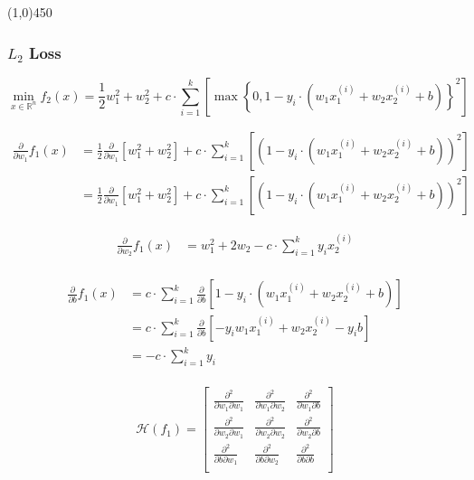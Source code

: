 \documentclass[12pt,landscape]{article}
\newcommand{\hr}{\begin{center} \line(1,0){450} \end{center}}
\begin{document}
\hr
\subsubsection*{$L_2$ Loss}
\newcommand{\lTwoLoss}{1-y_i \cdot \left( w_1  x_1^{(i)} + w_2  x_2^{(i)} + b\right)}
\begin{equation}
\min\limits_{x \in \mathbb{R}^n} f_2(x) = \frac{1}{2} w_1^2 + w_2^2 +c \cdot \sum\limits_{i=1}^k \left[ \max \left\{ 0,\lTwoLoss  \right\}^2\right]
\end{equation}


\begin{align}
\frac{\partial}{\partial w_1} f_1(x) &= \frac{1}{2} \frac{\partial}{\partial w_1} \left[  w_1^2 + w_2^2 \right]  +c \cdot \sum\limits_{i=1}^k  \left[ \left( \lTwoLoss \right)^2 \right]\\
&= \frac{1}{2} \frac{\partial}{\partial w_1} \left[  w_1^2 + w_2^2 \right]  +c \cdot \sum\limits_{i=1}^k  \left[ \left( \lTwoLoss \right)^2 \right]
\end{align}

\begin{align}
\frac{\partial}{\partial w_2} f_1(x) &= w_1^2 + 2w_2  - c \cdot \sum\limits_{i=1}^k y_i  x_2^{(i)} \\
\end{align}



\begin{align}
\frac{\partial}{\partial b} f_1(x) &= c \cdot \sum\limits_{i=1}^k  \frac{\partial}{\partial b} \left[ 1-y_i \cdot \left( w_1  x_1^{(i)} + w_2  x_2^{(i)} + b \right) \right]\\
&= c \cdot \sum\limits_{i=1}^k  \frac{\partial}{\partial b} \left[ -y_i w_1  x_1^{(i)} +  w_2  x_2^{(i)} -y_ib \right]\\
&= - c \cdot \sum\limits_{i=1}^k y_i\\
\end{align}


\begin{equation}
\mathcal{H}(f_1) = \begin{bmatrix}
\frac{\partial^2}{\partial w_1 \partial w_1} & \frac{\partial^2}{\partial w_1 \partial w_2} & \frac{\partial^2}{\partial w_1 \partial b}\\
\frac{\partial^2}{\partial w_2 \partial w_1} & \frac{\partial^2}{\partial w_2 \partial w_2} & \frac{\partial^2}{\partial w_2 \partial b}\\
\frac{\partial^2}{\partial b \partial w_1} & \frac{\partial^2}{\partial b \partial w_2} & \frac{\partial^2}{\partial b \partial b}\\
\end{bmatrix}
\end{equation}
\end{document}
